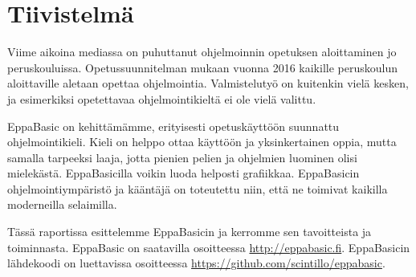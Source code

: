 
\section*{Tiivistelmä}
Viime aikoina mediassa on puhuttanut
ohjelmoinnin opetuksen aloittaminen
jo peruskouluissa.
Opetussuunnitelman mukaan vuonna
2016 kaikille peruskoulun aloittaville
aletaan opettaa ohjelmointia.
Valmistelutyö on kuitenkin vielä kesken,
ja esimerkiksi opetettavaa
ohjelmointikieltä ei ole vielä valittu.

EppaBasic on kehittämämme, erityisesti
opetuskäyttöön suunnattu
ohjelmointikieli.
Kieli on helppo ottaa käyttöön
ja yksinkertainen oppia,
mutta samalla tarpeeksi laaja,
jotta pienien pelien ja ohjelmien
luominen olisi mielekästä.
EppaBasicilla voikin luoda
helposti grafiikkaa.
EppaBasicin ohjelmointiympäristö ja kääntäjä
on toteutettu niin, että ne toimivat
kaikilla moderneilla selaimilla.

Tässä raportissa esittelemme EppaBasicin
ja kerromme sen tavoitteista ja toiminnasta.
EppaBasic on saatavilla osoitteessa \url{http://eppabasic.fi}.
EppaBasicin lähdekoodi on luettavissa
osoitteessa \url{https://github.com/scintillo/eppabasic}.